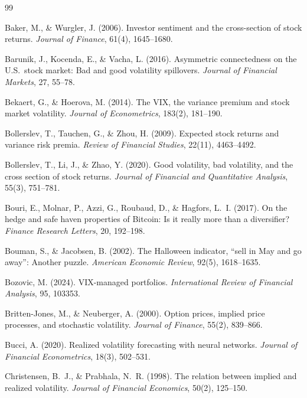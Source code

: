 \documentclass[12pt,a4paper]{article}
\begin{document}
\newpage

\begin{thebibliography}{99}

Baker, M., \& Wurgler, J. (2006). Investor sentiment and the cross-section of stock returns. \textit{Journal of Finance}, 61(4), 1645--1680.

Barunik, J., Kocenda, E., \& Vacha, L. (2016). Asymmetric connectedness on the U.S.\ stock market: Bad and good volatility spillovers. \textit{Journal of Financial Markets}, 27, 55--78.

Bekaert, G., \& Hoerova, M. (2014). The VIX, the variance premium and stock market volatility. \textit{Journal of Econometrics}, 183(2), 181--190.

Bollerslev, T., Tauchen, G., \& Zhou, H. (2009). Expected stock returns and variance risk premia. \textit{Review of Financial Studies}, 22(11), 4463--4492.

Bollerslev, T., Li, J., \& Zhao, Y. (2020). Good volatility, bad volatility, and the cross section of stock returns. \textit{Journal of Financial and Quantitative Analysis}, 55(3), 751--781.

Bouri, E., Molnar, P., Azzi, G., Roubaud, D., \& Hagfors, L.~I. (2017). On the hedge and safe haven properties of Bitcoin: Is it really more than a diversifier? \textit{Finance Research Letters}, 20, 192--198.

Bouman, S., \& Jacobsen, B. (2002). The Halloween indicator, ``sell in May and go away'': Another puzzle. \textit{American Economic Review}, 92(5), 1618--1635.

Bozovic, M. (2024). VIX-managed portfolios. \textit{International Review of Financial Analysis}, 95, 103353.

Britten-Jones, M., \& Neuberger, A. (2000). Option prices, implied price processes, and stochastic volatility. \textit{Journal of Finance}, 55(2), 839--866.

Bucci, A. (2020). Realized volatility forecasting with neural networks. \textit{Journal of Financial Econometrics}, 18(3), 502--531.

Christensen, B.~J., \& Prabhala, N.~R. (1998). The relation between implied and realized volatility. \textit{Journal of Financial Economics}, 50(2), 125--150.


\end{thebibliography}
\end{document}
